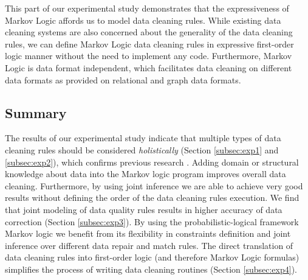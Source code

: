 This part of our experimental study demonstrates that the expressiveness of Markov Logic affords us to model data cleaning rules. While existing data cleaning systems \cite{Dallachiesa:2013:NCD:2463676.2465327} are also concerned about the generality of the data cleaning rules, we can define Markov Logic data cleaning rules in expressive first-order logic manner without the need to implement any code. Furthermore, Markov Logic is data format independent, which facilitates data cleaning on different data formats as provided on relational and graph data formats. 

\subsection{Summary}

The results of our experimental study indicate that multiple types of data cleaning rules should be considered \textit{holistically} (Section \ref{subsec:exp1} and \ref{subsec:exp2}), which confirms previous research \cite{Dallachiesa:2013:NCD:2463676.2465327, Fan:2014:IRM:2628135.2567657, Fan:2011:IRM:1989323.1989373}. Adding domain or structural knowledge about data into the Markov logic program improves overall data cleaning. Furthermore, by using joint inference we are able to achieve very good results without defining the order of the data cleaning rules execution. We find that joint modeling of data quality rules results in higher accuracy of data correction (Section \ref{subsec:exp3}). By using the probabilistic-logical framework Markov logic we benefit from its flexibility in constraints definition and joint inference over different data repair and match rules. The direct translation of data cleaning rules into first-order logic (and therefore Markov Logic formulas) simplifies the process of writing data cleaning routines (Section \ref{subsec:exp4}). 
